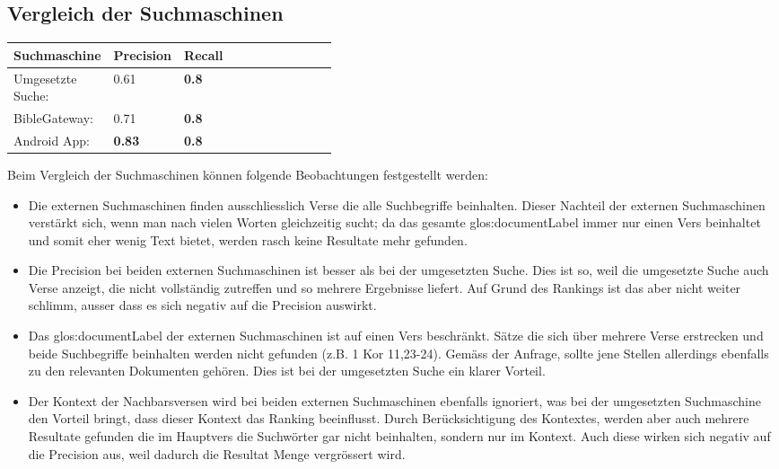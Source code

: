 \newpage
\subsection{Vergleich der Suchmaschinen}
\begin{table}[H]
	\centering
	\small\renewcommand{\arraystretch}{1.4}
	\begin{tabularx}{0.9\textwidth}{ L{0.22\linewidth} | L{0.2\linewidth} | X }%
		\hline
		\textbf{Suchmaschine} & \textbf{Precision} & \textbf{Recall} \\ \hline \hline
		Umgesetzte Suche: & 0.61 & \textbf{0.8}\\
		BibleGateway: & 0.71  & \textbf{0.8}\\
		Android App: & \textbf{0.83} & \textbf{0.8}\\
		\hline
	\end{tabularx}
\end{table}

Beim Vergleich der Suchmaschinen können folgende Beobachtungen festgestellt werden:
\begin{itemize}[noitemsep]
	\item Die externen Suchmaschinen finden ausschliesslich Verse die alle Suchbegriffe beinhalten.
	Dieser Nachteil der externen Suchmaschinen verstärkt sich, wenn man nach vielen Worten gleichzeitig sucht; da das gesamte \gls{glos:documentLabel} immer nur einen Vers beinhaltet und somit eher wenig Text bietet, werden rasch keine Resultate mehr gefunden.
	
	\item Die Precision bei beiden externen Suchmaschinen ist besser als bei der umgesetzten Suche.
	Dies ist so, weil die umgesetzte Suche auch Verse anzeigt, die nicht vollständig zutreffen und so mehrere Ergebnisse liefert. Auf Grund des Rankings ist das aber nicht weiter schlimm, ausser dass es sich negativ auf die Precision auswirkt.
	
	\item Das \gls{glos:documentLabel} der externen Suchmaschinen ist auf einen Vers beschränkt. Sätze die sich über mehrere Verse erstrecken und beide Suchbegriffe beinhalten werden nicht gefunden (z.B. 1 Kor 11,23-24).
	Gemäss der Anfrage, sollte jene Stellen allerdings ebenfalls zu den relevanten Dokumenten gehören.
	Dies ist bei der umgesetzten Suche ein klarer Vorteil.
	
	\item Der Kontext der Nachbarsversen wird bei beiden externen Suchmaschinen ebenfalls ignoriert, was bei der umgesetzten Suchmaschine den Vorteil bringt, dass dieser Kontext das Ranking beeinflusst.
	Durch Berücksichtigung des Kontextes, werden aber auch mehrere Resultate gefunden die im Hauptvers die Suchwörter gar nicht beinhalten, sondern nur im Kontext.
	Auch diese wirken sich negativ auf die Precision aus, weil dadurch die Resultat Menge vergrössert wird.
	
\end{itemize}


